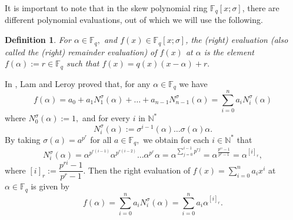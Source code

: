 \documentclass[12pt,paper]{article}
\newcommand{\hlc}[2][yellow]{ {\sethlcolor{#1} \hl{#2}} }
\theoremstyle{plain}
\newtheorem{definition}[theorem]{Definition}
\def\dsum #1#2{\displaystyle{\sum_{#1}^{#2}}}
\newcommand{\Fq}{\mathbb{F}_{q}}
\begin{document}
It is important to note that in the skew polynomial ring $\Fq[x;\sigma]$, there are different polynomial evaluations, out of which we will use the following. 

\begin{definition} \cite[p. 310]{Lam1988}\label{def.2}
For $\alpha \in \Fq,$ and $f(x)\in \Fq[x;\sigma]$,
  the \emph{(right) evaluation} (also called  the \emph{(right) remainder evaluation})  of $f(x)$ at $\alpha$ is the element $f(\alpha ):=r \in \Fq$ such that $f(x)= q(x)(x-\alpha)+r.$
\end{definition}

In \cite[Proposition 2.9]{Lam1988}, Lam and Leroy  proved that, for any $\alpha\in \Fq$ we have   
\begin{equation}\label{e1}
f(\alpha)= a_0 + a_1 N^{\sigma}_1(\alpha) +\ldots+ a_{n-1} N^{\sigma}_{n-1}(\alpha)=  \dsum{i=0}{n} a_i N^{\sigma}_i(\alpha)
\end{equation}
where $  N^{\sigma}_{0}(\alpha):=1 ,$ and  for  every $i$ in $\mathbb{N}^*$  
$$
N^{\sigma}_i(\alpha):=\sigma^{i-1}(\alpha) \ldots \sigma(\alpha) \alpha.
$$
By taking  $\sigma(a)=a^{p^r} $ for all $a\in \Fq,$ we obtain  for each $ i \in \mathbb{N}^*$  that
\begin{equation}\label{Eqsigma}
N_i^{\sigma}(\alpha)=\alpha^{p^{r (i-1)}} \alpha^{p^{r (i-2)}} \ldots  \alpha^{p^{r}} \alpha =  \alpha^{ \sum_{j=0}^{i-1} p^{rj}}= \alpha^{{\frac{ p^{ri}-1}{p^r-1}}}= \alpha^{[i]_r},
\end{equation}
where $[i]_{r}:=  \dfrac{ p^{ri}-1}{p^r-1}$. Then the  right evaluation of $f(x)=\dsum{i=0}{n} a_i x^i$ at $\alpha\in \Fq$ is given by 
\begin{equation*}
f(\alpha)= \dsum{i=0}{n} a_i N^{\sigma}_i(\alpha)= \dsum{i=0}{n} a_i \alpha^{[i]_r}.
\end{equation*}

\end{document}
